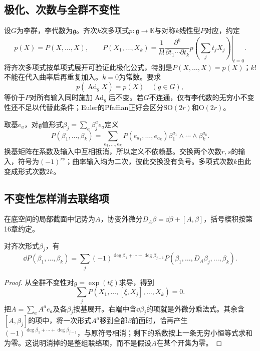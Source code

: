 \subsection{极化、次数与全群不变性}
设$G$为李群，李代数为$\mathfrak g$。齐次$k$次多项式$p:\mathfrak g\to\mathbb K$与对称$k$线性型$P$对应，约定
\[
 p(X)=P(X,\ldots,X),\qquad
 P(X_1,\ldots,X_k)=\left.\frac1{k!}
 \frac{\partial^k}{\partial t_1\cdots\partial t_k}
 p\left(\sum_jt_jX_j\right)\right|_{t=0}.
\]
将齐次多项式按单项式展开可验证此极化公式，特别是$P(X,\ldots,X)=p(X)$；$k!$不能在代入曲率后再重复加入。$k=0$为常数。要求
\[
 p(\operatorname{Ad}_gX)=p(X)\quad(g\in G),
\]
等价于$P$对所有输入同时施加$\operatorname{Ad}_g$后不变。若$G$不连通，仅有李代数的无穷小不变性还不足以代替此条件；Euler的Pfaffian正好会区分$\mathrm{SO}(2r)$和$\mathrm O(2r)$。

取基$e_a$，对$\mathfrak g$值形式$\beta_j=\sum_a\beta_j^ae_a$定义
\begin{equation}\label{eq:polarized-forms}
 P(\beta_1,\ldots,\beta_k)=
 \sum_{a_1,\ldots,a_k}P(e_{a_1},\ldots,e_{a_k})
 \beta_1^{a_1}\wedge\cdots\wedge\beta_k^{a_k}.
\end{equation}
换基矩阵在系数及输入中互相抵消，所以定义不依赖基。交换两个次数$r,s$的输入，符号为$(-1)^{rs}$；曲率输入均为二次，彼此交换没有负号。多项式次数$k$由此变成形式次数$2k$。

\subsection{不变性怎样消去联络项}
在底空间的局部截面中记势为$A$，协变外微分$D_A\beta=\dd\beta+[A,\beta]$，括号楔积按第16章约定。

\begin{proposition}\label{prop:invariant-derivative}
对齐次形式$\beta_j$，有
\begin{equation}\label{eq:invariant-derivative}
 \dd P(\beta_1,\ldots,\beta_k)
 =\sum_j(-1)^{\deg\beta_1+\cdots+\deg\beta_{j-1}}
 P(\beta_1,\ldots,D_A\beta_j,\ldots,\beta_k).
\end{equation}
\end{proposition}
\begin{proof}
从全群不变性对$g=\exp(t\xi)$求导，得到
\[
 \sum_jP(X_1,\ldots,[\xi,X_j],\ldots,X_k)=0.
\]
把$A=\sum_aA^ae_a$及各$\beta_j$按基展开。右端中含$\dd\beta_j$的项就是外微分乘法式。其余含$[A,\beta_j]$的项中，将一次形式$A^a$移到全部$\beta$前面时，恰再产生$(-1)^{\deg\beta_1+\cdots+\deg\beta_{j-1}}$，与原符号相消；剩下的系数按上一条无穷小恒等式求和为零。这说明消掉的是整组联络项，而不是假设$A$在某个开集为零。
\end{proof}

